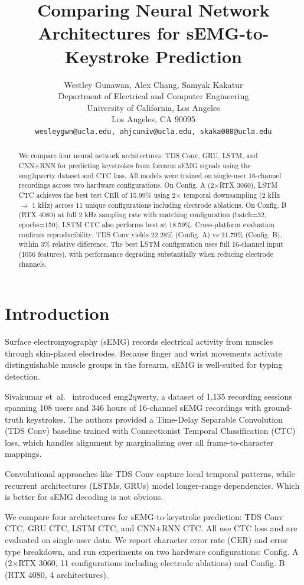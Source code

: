 \documentclass{article}
\title{Comparing Neural Network Architectures for sEMG-to-Keystroke Prediction}
\author{%
  Westley Gunawan, Alex Chang, Samyak Kakatur \\
  Department of Electrical and Computer Engineering\\
  University of California, Los Angeles\\
  Los Angeles, CA 90095 \\
  \texttt{wesleygwn@ucla.edu, ahjcuniv@ucla.edu, skaka008@ucla.edu} \\
}
\begin{document}
\maketitle


\begin{abstract}
  We compare four neural network architectures: TDS Conv, GRU, LSTM, and CNN+RNN for predicting keystrokes from forearm sEMG signals using the emg2qwerty dataset and CTC loss. All models were trained on single-user 16-channel recordings across two hardware configurations. On Config. A (2$\times$RTX 3060), LSTM CTC achieves the best test CER of 15.99\% using 2$\times$ temporal downsampling (2 kHz $\to$ 1 kHz) across 11 unique configurations including electrode ablations. On Config. B (RTX 4080) at full 2 kHz sampling rate with matching configuration (batch=32, epochs=150), LSTM CTC also performs best at 18.59\%. Cross-platform evaluation confirms reproducibility: TDS Conv yields 22.28\% (Config. A) vs 21.79\% (Config. B), within 3\% relative difference. The best LSTM configuration uses full 16-channel input (1056 features), with performance degrading substantially when reducing electrode channels.
\end{abstract}


\section{Introduction}

Surface electromyography (sEMG) records electrical activity from muscles through skin-placed electrodes. Because finger and wrist movements activate distinguishable muscle groups in the forearm, sEMG is well-suited for typing detection.

Sivakumar et~al.\ \citep{sivakumar2024emg2qwertylargedatasetbaselines} introduced emg2qwerty, a dataset of 1,135 recording sessions spanning 108 users and 346 hours of 16-channel sEMG recordings with ground-truth keystrokes. The authors provided a Time-Delay Separable Convolution (TDS Conv) baseline trained with Connectionist Temporal Classification (CTC) loss, which handles alignment by marginalizing over all frame-to-character mappings.

Convolutional approaches like TDS Conv capture local temporal patterns, while recurrent architectures (LSTMs, GRUs) model longer-range dependencies. Which is better for sEMG decoding is not obvious.

We compare four architectures for sEMG-to-keystroke prediction: TDS Conv CTC, GRU CTC, LSTM CTC, and CNN+RNN CTC. All use CTC loss and are evaluated on single-user data. We report character error rate (CER) and error type breakdown, and run experiments on two hardware configurations: Config. A (2$\times$RTX 3060, 11 configurations including electrode ablations) and Config. B (RTX 4080, 4 architectures).
\end{document}
